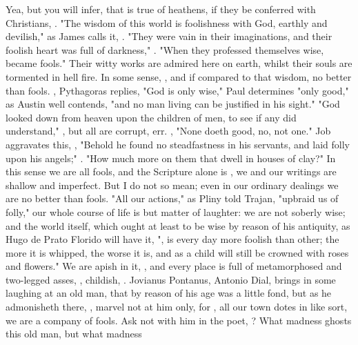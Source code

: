 Yea, but you will infer, that is true of heathens, if they be conferred with
Christians, . "The wisdom of this world is
foolishness with God, earthly and devilish," as James calls it, . "They were vain in their imaginations, and their foolish heart was full of
darkness," . "When they professed themselves wise,
became fools." Their witty works are admired here on earth, whilst their souls
are tormented in hell fire. In some sense, , and if compared
to that wisdom, no better than fools. ,
Pythagoras replies, "God is only wise,"  Paul determines "only good," as Austin well contends, "and no man
living can be justified in his sight." "God looked down from heaven upon the
children of men, to see if any did understand," , but all are corrupt, err. , "None doeth good,
no, not one." Job aggravates this, , "Behold he found no
steadfastness in his servants, and laid folly upon his angels;" .
"How much more on them that dwell in houses of clay?" In this sense we are all
fools, and the Scripture alone is , we and
our writings are shallow and imperfect. But I do not so mean; even in our
ordinary dealings we are no better than fools. "All our actions," as
Pliny told Trajan, "upbraid us of folly," our whole course
of life is but matter of laughter: we are not soberly wise; and the world
itself, which ought at least to be wise by reason of his antiquity, as
Hugo de Prato Florido will have it, ",
is every day more foolish than other; the more it is whipped, the worse it is,
and as a child will still be crowned with roses and flowers." We are apish in
it, , and every place is full  of
metamorphosed and two-legged asses, , childish,
. Jovianus Pontanus,
Antonio Dial, brings in some laughing at an old man, that by reason of his age
was a little fond, but as he admonisheth there, , marvel not at him only, for , all our
town dotes in like sort, we are a company of fools. Ask not
with him in the poet, ? What madness ghosts this old man, but what madness
